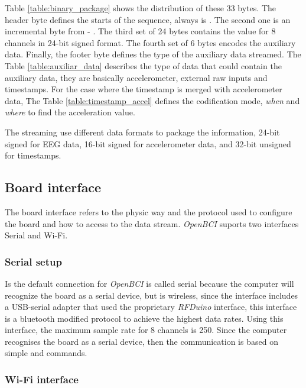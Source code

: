 Table \ref{table:binary_package} shows the distribution of these 33 bytes. The header byte defines the starts of the sequence, always is . The second one is an incremental byte from  - . The third set of 24 bytes contains the value for 8 channels in 24-bit signed format. The fourth set of 6 bytes encodes the auxiliary data. Finally, the footer byte defines the type of the auxiliary data streamed. The Table \ref{table:auxiliar_data} describes the type of data that could contain the auxiliary data, they are basically accelerometer, external raw inputs and timestamps. For the case where the timestamp is merged with accelerometer data, The Table \ref{table:timestamp_accel} defines the codification mode, \textit{when} and \textit{where} to find the acceleration value.

The streaming use different data formats to package the information, 24-bit signed for \gls*{EEG} data, 16-bit signed for accelerometer data, and 32-bit unsigned for timestamps.

\subsection{Board interface}

The board interface refers to the physic way and the protocol used to configure the board and how to access to the data stream. \textit{OpenBCI} suports two interfaces Serial and Wi-Fi.

\subsubsection{Serial setup}

Is the default connection for \textit{OpenBCI} is called serial because the computer will recognize the board as a serial device, but is wireless, since the interface includes a USB-serial adapter that used the proprietary \textit{RFDuino} interface, this interface is a bluetooth modified protocol to achieve the highest data rates. Using this interface, the maximum sample rate for 8 channels is 250. Since the computer recognises the board as a serial device, then the communication is based on simple  and  commands.

\subsubsection{Wi-Fi interface}

